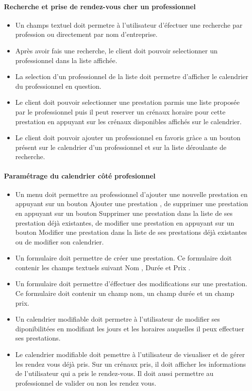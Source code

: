\documentclass{article}
\begin{document}
\paragraph{Recherche et prise de rendez-vous cher un professionnel}
\begin{itemize}
\item Un champs textuel doit permetre à l'utilisateur d'éfectuer une
  recherche par profession ou directement par nom
  d'entreprise.
\item Après avoir fais une recherche, le client doit pouvoir selectionner un
  professionnel dans la liste affichée. 
\item La selection d'un
  professionnel de la liste doit permetre d'afficher le
  calendrier du professionnel en question.
\item Le client doit pouvoir selectionner une prestation parmis une liste
  proposée par le professionnel puis il peut reserver un crénaux
  horaire pour cette prestation en appuyant sur les crénaux
  disponibles affichés sur le calendrier.
\item Le client doit pouvoir ajouter un professionnel en favoris gràce
  a un bouton présent sur le calendrier d'un professionnel et sur la
  liste déroulante de recherche.
\end{itemize}


\paragraph{Paramétrage du calendrier côté profesionnel}
\begin{itemize}
\item Un menu doit permettre au professionnel d'ajouter une nouvelle
  prestation en appuyant sur un bouton \og Ajouter une prestation \fg{}, de
  supprimer une prestation en appuyant sur un bouton \og Supprimer une
  prestation \fg{} dans la liste de ses prestation déjà existantes, de modifier une prestation en appuyant sur un
  bouton \og Modifier une prestation \fg{} dans la liste de ses
  prestations déjà existantes
  ou de modifier son calendrier. 
\item Un formulaire doit permettre de créer une prestation. Ce
  formulaire doit contenir les champs textuels suivant \og Nom \fg{},
  \og Durée \fg{} et \og Prix \fg{}.  
\item Un formulaire doit permettre d'éffectuer des modifications sur
  une prestation. Ce formulaire doit contenir un champ nom, un champ
  durée et un champ prix.  
\item Un calendrier modifiable doit permetre à l'utilisateur de
  modifier ses diponibilitées en modifiant les jours et les horaires
  auquelles il peux effectuer ses prestations.
\item Le calendrier modifiable doit pemettre à l'utilisateur de
  visualiser et de gérer les rendez vous déjà pris. Sur un crénaux
  pris, il doit afficher les informations de l'utilisateur qui a pris
  le rendez-vous. Il doit aussi permettre au professionnel de valider
  ou non les rendez vous. 
\end{itemize}
\end{document}
